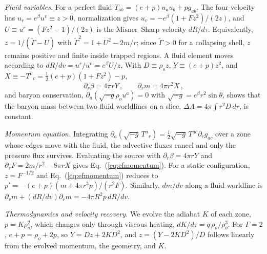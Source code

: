 \documentclass[%
 reprint,
 amsmath,amssymb,
 aps,prd,
 superscriptaddress,
]{revtex4-2}
\begin{document}
\emph{Fluid variables.} For a perfect fluid $T_{ab}=(e+p)u_au_b+pg_{ab}$. The four-velocity has $u_r=e^\beta u^v\equiv z>0$, normalization gives $u_v=-e^\beta(1+Fz^2)/(2z)$, and $U\equiv u^r=(Fz^2-1)/(2z)$ is the Misner--Sharp velocity $dR/d\tau$. Equivalently, $z=1/(\tilde\Gamma-U)$ with $\tilde\Gamma^2=1+U^2-2m/r$; since $\tilde\Gamma>0$ for a collapsing shell, $z$ remains positive and finite inside trapped regions. A fluid element moves according to $dR/dv=u^r/u^v=e^\beta U/z$. With $D\equiv\rho_oz$, $Y\equiv(e+p)z^2$, and $X\equiv-T^v{}_v=\frac{1}{2}(e+p)(1+Fz^2)-p$,
\begin{equation}
\partial_r\beta=4\pi rY\,,\qquad \partial_rm=4\pi r^2X\,,
\end{equation}
and baryon conservation, $\partial_a(\sqrt{-g}\rho_ou^a)=0$ with $\sqrt{-g}=e^\beta r^2\sin\theta$, shows that the baryon mass between two fluid worldlines on a slice, $\Delta A=4\pi\int r^2D\,dr$, is constant.

\emph{Momentum equation.} Integrating $\partial_a(\sqrt{-g}\,T^a{}_r)=\frac{1}{2}\sqrt{-g}\,T^{ac}\partial_rg_{ac}$ over a zone whose edges move with the fluid, the advective fluxes cancel and only the pressure flux survives. Evaluating the source with $\partial_r\beta=4\pi rY$ and $\partial_rF=2m/r^2-8\pi rX$ gives Eq.~(\ref{eq:efmomentum}). For a static configuration, $z=F^{-1/2}$ and Eq.~(\ref{eq:efmomentum}) reduces to $p'=-(e+p)(m+4\pi r^3p)/(r^2F)$. Similarly, $dm/dv$ along a fluid worldline is $\partial_vm+(dR/dv)\partial_rm=-4\pi R^2p\,dR/dv$.

\emph{Thermodynamics and velocity recovery.} We evolve the adiabat $K$ of each zone, $p=K\rho_o^2$, which changes only through viscous heating, $dK/d\tau=q\,\dot\rho_o/\rho_o^3$. For $\Gamma=2$, $e+p=\rho_o+2p$, so $Y=Dz+2KD^2$, and $z=(Y-2KD^2)/D$ follows linearly from the evolved momentum, the geometry, and $K$.
\end{document}
